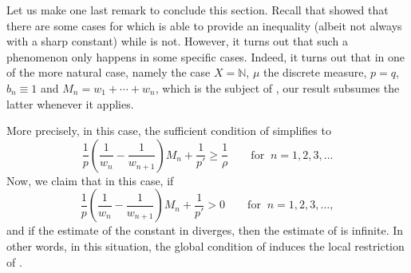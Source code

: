 \documentclass[oneside,10pt]{article}          %
\numberwithin{equation}{section}
\begin{document}
Let us make one last remark to conclude this section. Recall that  showed that there are some cases for which \cite[Theorem 1]{Bouthat2023} is able to provide an inequality (albeit not always with a sharp constant) while  is not. However, it turns out that such a phenomenon only happens in some specific cases. Indeed, it turns out that in one of the more natural case, namely the case $X=\mathbb{N}$, $\mu$ the discrete measure, $p=q$, $b_n\equiv 1$ and $M_n=w_1+\cdots + w_n$, which is the subject of \cite[Theorem 1]{Bouthat2023}, our result subsumes the latter whenever it applies. 

More precisely, in this case, the sufficient condition of  simplifies to
\begin{equation}\label{eq - reduced}
    \frac{1}{p}\left(\frac{1}{w_n}-\frac{1}{w_{n+1}}\right)\!M_n+\frac{1}{p'} \geq \frac{1}{\rho} \qquad \text{for }~ n=1,2,3,\dots
\end{equation}
Now, we claim that in this case, if
\[
\frac{1}{p}\left(\frac{1}{w_n}-\frac{1}{w_{n+1}}\right)\!M_n+\frac{1}{p'} > 0 \qquad \text{for }~ n=1,2,3,\dots,
\]
and if the estimate of the constant in  diverges, then the estimate of \cite[Theorem 1]{Bouthat2023} is infinite. In other words, in this situation, the global condition of \cite[Theorem 1]{Bouthat2023} induces the local restriction of .



\end{document}
